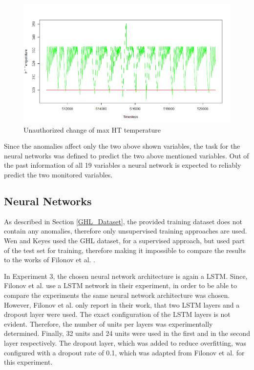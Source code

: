 \begin{figure}[h]
	\centering
	\includegraphics[scale=0.4]{Figures/anomaly_max_HT_temp}
	\decoRule
	\caption[Unauthorized change of max HT temperature]{Unauthorized change of max HT temperature \parencite{Own}}
	\label{fig:anomaly_max_HT_temp}
\end{figure}

Since the anomalies affect only the two above shown variables, the task for the neural networks was defined to predict the two above mentioned variables. Out of the past information of all 19 variables a neural network is expected to reliably predict the two monitored variables.

\subsection{Neural Networks}
As described in Section \ref{GHL_Dataset}, the provided training dataset does not contain any anomalies, therefore only unsupervised training approaches are used. Wen and Keyes \parencite*{Wen2019} used the GHL dataset, for a supervised approach, but used part of the test set for training, therefore making it impossible to compare the results to the works of Filonov et al. \parencite*{Filonov2016}.

In Experiment 3, the chosen neural network architecture is again a LSTM. Since, Filonov et al. \parencite*{Filonov2016} use a LSTM network in their experiment, in order to be able to compare the experiments the same neural network architecture was chosen. However, Filonov et al. only report in their work, that two LSTM layers and a dropout layer were used. The exact configuration of the LSTM layers is not evident. Therefore, the number of units per layers was experimentally determined. Finally, 32 units and 24 units were used in the first and in the second layer respectively. The dropout layer, which was added to reduce overfitting, was configured with a dropout rate of 0.1, which was adapted from Filonov et al. \parencite*{Filonov2016} for this experiment. 

